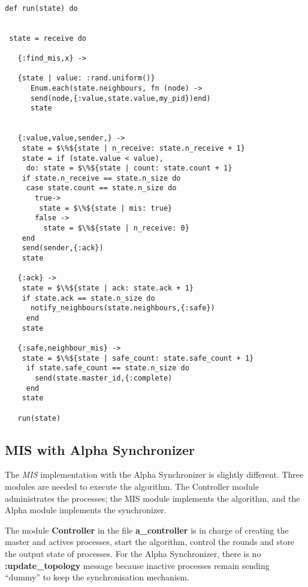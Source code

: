 \begin{lstlisting}[frame=single, columns=fullflexible, mathescape=true, caption= run function for \textit{MIS} , label = code:run_global]

def run(state) do


 state = receive do

   {:find_mis,x} ->  

   {state | value: :rand.uniform()}
      Enum.each(state.neighbours, fn (node) ->
      send(node,{:value,state.value,my_pid})end)
      state


   {:value,value,sender,} ->
    state = $\%${state | n_receive: state.n_receive + 1}
    state = if (state.value < value),
     do: state = $\%${state | count: state.count + 1} 
    if state.n_receive == state.n_size do
     case state.count == state.n_size do
       true->  
        state = $\%${state | mis: true}
       false ->
         state = $\%${state | n_receive: 0}
    end
    send(sender,{:ack})
    state

   {:ack} ->
    state = $\%${state | ack: state.ack + 1}
    if state.ack == state.n_size do
      notify_neighbours(state.neighbours,{:safe})
     end
    state

   {:safe,neighbour_mis} ->
    state = $\%${state | safe_count: state.safe_count + 1}
     if state.safe_count == state.n_size do
       send(state.master_id,{:complete)
     end
    state
    
   run(state)

\end{lstlisting}

\subsection{MIS with Alpha Synchronizer}

The \textit{MIS} implementation with the Alpha Synchronizer is slightly different. Three modules are needed to execute the algorithm. The Controller module administrates the processes; the MIS module implements the algorithm, and the Alpha module implements the synchronizer.

The module \textbf{Controller} in the file \textbf{a\_controller} is in charge of creating the master and actives processes, start the algorithm, control the rounds and store the output state of processes. For the Alpha Synchronizer, there is no \textbf{:update\_topology} message because inactive processes remain sending ``dummy'' to keep the synchronisation mechanism.


